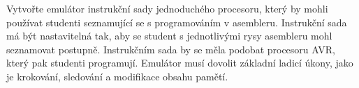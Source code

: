 Vytvořte emulátor instrukční sady jednoduchého procesoru, který by mohli používat studenti seznamující se s programováním v asembleru. Instrukční sada má být nastavitelná tak, aby se student s jednotlivými rysy asembleru mohl seznamovat postupně. Instrukčním sada by se měla podobat procesoru AVR, který pak studenti programují. Emulátor musí dovolit základní ladicí úkony, jako je krokování, sledování a modifikace obsahu pamětí.

